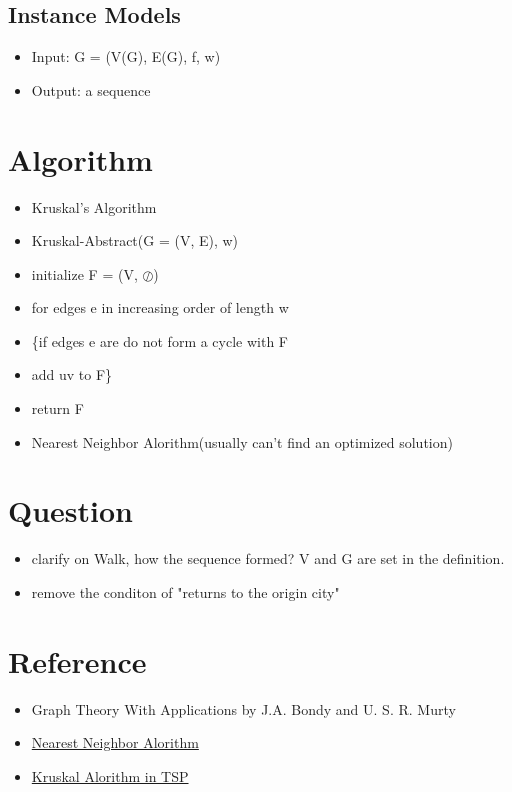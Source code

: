 \documentclass[12pt]{article}
\begin{document}
\subsection{Instance Models}
\begin{itemize}
    \item Input: G = (V(G), E(G), f, w)
    \item Output: a sequence
\end{itemize}

\section{Algorithm}
\begin{itemize}
    \item Kruskal’s Algorithm
    \item Kruskal-Abstract(G = (V, E), w) 
    \item initialize F = (V, $\oslash$)
    \item for edges e in increasing order of length w
    \item \{if edges e are do not form a cycle with F
    \item add uv to F\}
    \item return F

    \item Nearest Neighbor Alorithm(usually can't find an optimized solution)
\end{itemize}

\section{Question}
\begin{itemize}
    \item clarify on Walk, how the sequence formed? V and G are set in the definition.
    \item remove the conditon of "returns to the origin city"
\end{itemize}

\section{Reference}
\begin{itemize}
    \item Graph Theory With Applications by J.A. Bondy and U. S. R. Murty
    \item \href{http://math.mit.edu/~goemans/18433S15/TSP-CookCPS.pdf}{Nearest Neighbor Alorithm} 
    \item \href{https://www.ams.org/journals/proc/1956-007-01/S0002-9939-1956-0078686-7/home.html}{Kruskal  Alorithm in TSP} 
\end{itemize}
\end{document}
